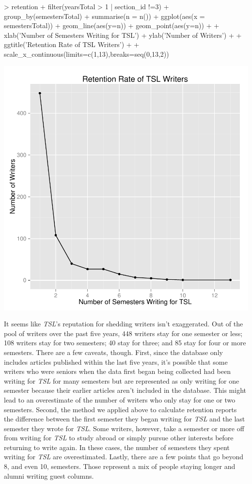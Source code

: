 \documentclass[a4paper]{article}
\begin{document}
\begin{Schunk}
\begin{Sinput}
> retention %
+   filter(yearsTotal > 1 | section_id !=3) %
+   group_by(semestersTotal) %
+   summarise(n = n()) %
+   ggplot(aes(x = semestersTotal)) + geom_line(aes(y=n)) + geom_point(aes(y=n)) +
+   xlab('Number of Semesters Writing for TSL') + ylab('Number of Writers') +
+   ggtitle('Retention Rate of TSL Writers') +
+   scale_x_continuous(limits=c(1,13),breaks=seq(0,13,2))
\end{Sinput}
\end{Schunk}
\includegraphics{FinalProject-015}

It seems like \textit{TSL}'s reputation for shedding writers isn't exaggerated. Out of the pool of writers over the past five years, 448 writers stay for one semester or less; 108 writers stay for two semesters; 40 stay for three; and 85 stay for four or more semesters. There are a few caveats, though. First, since the database only includes articles published within the last five years, it's possible that some writers who were seniors when the data first began being collected had been writing for \textit{TSL} for many semesters but are represented as only writing for one semester because their earlier articles aren't included in the database. This might lead to an overestimate of the number of writers who only stay for one or two semesters. Second, the method we applied above to calculate retention reports the difference between the first semester they began writing for \textit{TSL} and the last semester they wrote for \textit{TSL}. Some writers, however, take a semester or more off from writing for \textit{TSL} to study abroad or simply pursue other interests before returning to write again. In these cases, the number of semesters they spent writing for \textit{TSL} are overestimated. Lastly, there are a few points that go beyond 8, and even 10, semesters. Those represent a mix of people staying longer and alumni writing guest columns.
\end{document}
